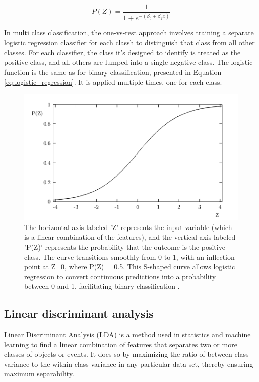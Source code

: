             \begin{equation} \label{eq:logistic_regression}
                P(Z) = \frac{1}{1 + e^{-(\beta_0 + \beta_1 x)}}
            \end{equation}

            In multi class classification, the one-vs-rest approach involves training a separate logistic regression classifier for each classh to distinguish that class from all other classes. For each classifier, the class it's designed to identify is treated as the positive class, and all others are lumped into a single negative class.
            The logistic function is the same as for binary classification, presented in Equation \ref{eq:logistic_regression}. It is applied multiple times, one for each class.
            
            \begin{figure}[htbp]
                \centering
                \includegraphics[width=.8\textwidth]{../src/resources/logistic.png}
                \caption{
                    The horizontal axis labeled 'Z' represents the input variable (which is a linear combination of the features), and the vertical axis labeled 'P(Z)' represents the probability that the outcome is the positive class. The curve transitions smoothly from 0 to 1, with an inflection point at Z=0, where P(Z) = 0.5. This S-shaped curve allows logistic regression to convert continuous predictions into a probability between 0 and 1, facilitating binary classification \cite{cramer_origins_2002}.
                }
                \label{fig:logistic_regression}
            \end{figure}

        \subsection{Linear discriminant analysis}
            Linear Discriminant Analysis (LDA) is a method used in statistics and machine learning to find a linear combination of features that separates two or more classes of objects or events. It does so by maximizing the ratio of between-class variance to the within-class variance in any particular data set, thereby ensuring maximum separability.

